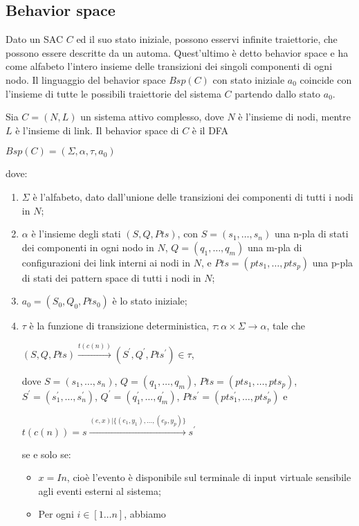 \subsection{Behavior space}
Dato un SAC $C$ ed il suo stato iniziale, possono esservi infinite traiettorie, che possono essere descritte da un automa. 
Quest'ultimo è detto behavior space e ha come alfabeto l'intero insieme delle transizioni dei singoli componenti di ogni nodo.
Il linguaggio del behavior space $Bsp(C)$ con stato iniziale $a_0$ coincide con l'insieme di tutte le possibili traiettorie del sistema $C$ partendo dallo stato $a_0$. 
\begin{defn}
Sia $C = (N,L)$ un sistema attivo complesso, dove $N$ è l'insieme di nodi, mentre $L$ è l'insieme di link. Il behavior space di $C$ è il DFA
\begin{center}
	$Bsp(C) = (\Sigma,\alpha,\tau,a_0)$
\end{center}
dove:
\begin{enumerate}
\item $\Sigma$ è l'alfabeto, dato dall'unione delle transizioni dei componenti di tutti i nodi in $N$;
\item $\alpha$  è l'insieme degli stati $(S,Q,Pts)$, con $S = (s_1,\ldots,s_n)$ una n-pla di stati dei componenti in ogni nodo in $N$, $Q = (q_1, \ldots,q_m)$ una m-pla di configurazioni dei link interni ai nodi in $N$, e $Pts = (pts_1, \ldots, pts_p)$ una p-pla di stati dei pattern space di tutti i nodi in $N$;
\item $a_0 = (S_0,Q_0,Pts_0)$ è lo stato iniziale;
\item $\tau$ è la funzione di transizione deterministica, $\tau: \alpha \times \Sigma \rightarrow \alpha$, tale che 
\begin{center}
$(S,Q,Pts) \xrightarrow{t(c(n))} (S^\prime, Q^\prime, Pts^\prime) \in \tau$,
\end{center}
dove $S = (s_1, \ldots,s_n)$, $Q = (q_1, \ldots,q_m)$, $Pts = (pts_1, \ldots, pts_p)$, $S^\prime = (s^\prime_1, \ldots,s^\prime_n)$, $Q^\prime = (q^\prime_1, \ldots,q^\prime_m)$, $Pts^\prime = (pts_1^\prime, \ldots, pts_p^\prime)$ e
\begin{center}
$t(c(n)) = s \xrightarrow{(e,x) | \{(e_1,y_1), \ldots, (e_p,y_p)\}} s^\prime$
\end{center}
se e solo se:
\begin{itemize}
\item $x = In$, cioè l'evento è disponibile sul terminale di input virtuale sensibile agli eventi esterni al sistema;
\item Per ogni $i \in [1 \ldots n]$, abbiamo

\end{itemize}
\end{enumerate}
\end{defn}
